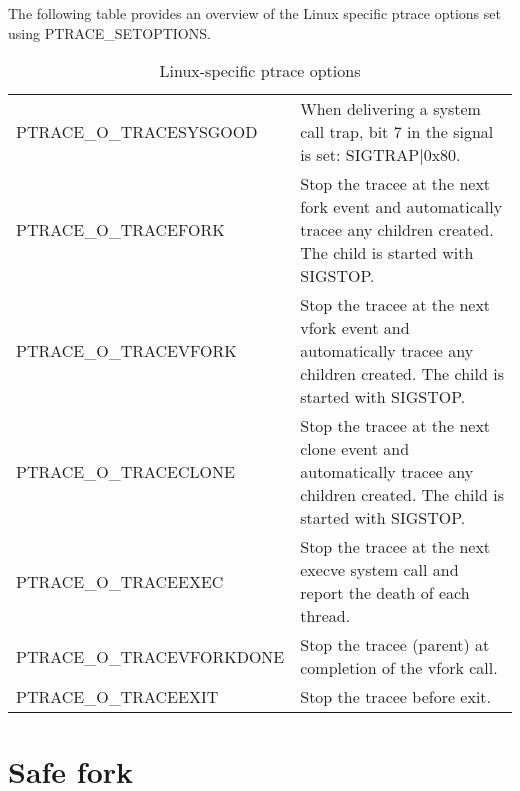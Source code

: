 \documentclass[a4paper, 10pt]{report}
\begin{document}
\newpage

The following table provides an overview of the Linux specific ptrace
options set using PTRACE\_SETOPTIONS.

\begin{table}[h!]
    \centering
    \begin{tabular}{|l|p{8cm}|}
    \hline
        PTRACE\_O\_TRACESYSGOOD & When delivering a system call trap, bit 7 in
    the signal is set: SIGTRAP$|$0x80.\\
        PTRACE\_O\_TRACEFORK & Stop the tracee at the next fork event and
    automatically tracee any children created. The child is started with
    SIGSTOP. \\
        PTRACE\_O\_TRACEVFORK & Stop the tracee at the next vfork event and
    automatically tracee any children created. The child is started with
    SIGSTOP. \\
        PTRACE\_O\_TRACECLONE & Stop the tracee at the next clone event and
    automatically tracee any children created. The child is started with
    SIGSTOP. \\
        PTRACE\_O\_TRACEEXEC & Stop the tracee at the next execve system call
    and report the death of each thread. \\
        PTRACE\_O\_TRACEVFORKDONE & Stop the tracee (parent) at completion
    of the vfork call. \\
        PTRACE\_O\_TRACEEXIT & Stop the tracee before exit. \\
    \hline
    \end{tabular}
    \caption{Linux-specific ptrace options}
    \label{tab:ptrace-opt}
\end{table}


\chapter{Safe fork}
\label{appendix:safefork-asm}

\end{document}

